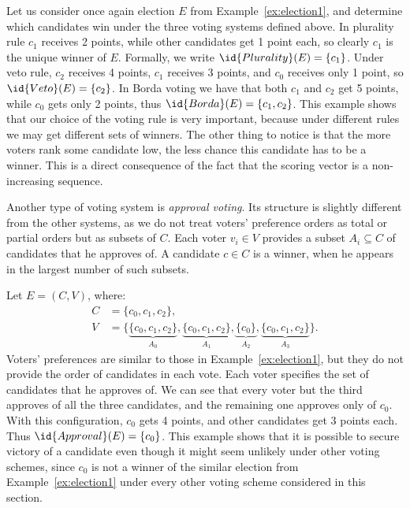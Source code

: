 Let us consider once again election $E$ from Example~\ref{ex:election1}, and determine which candidates win under the three voting systems defined above.
In plurality rule $c_1$ receives 2 points, while other candidates get 1 point each, so clearly $c_1$ is the unique winner of $E$.
Formally, we write $\id{Plurality}(E)=\{c_1\}$.
Under veto rule, $c_2$ receives 4 points, $c_1$ receives 3 points, and $c_0$ receives only 1 point, so $\id{Veto}(E)=\{c_2\}$.
In Borda voting we have that both $c_1$ and $c_2$ get 5 points, while $c_0$ gets only 2 points, thus $\id{Borda}(E)=\{c_1,c_2\}$.
This example shows that our choice of the voting rule is very important, because under different rules we may get different sets of winners.
The other thing to notice is that the more voters rank some candidate low, the less chance this candidate has to be a winner.
This is a direct consequence of the fact that the scoring vector is a non-increasing sequence.

Another type of voting system is \emph{approval voting}.
Its structure is slightly different from the other systems, as we do not treat voters' preference orders as total or partial orders but as subsets of $C$.
Each voter $v_i\in V$ provides a subset $A_i\subseteq C$ of candidates that he approves of.
A candidate $c\in C$ is a winner, when he appears in the largest number of such subsets.

\begin{Example} \label{ex:election2}
    Let $E=(C,V)$, where:
	\begin{align*}
		C &= \{c_0,c_1,c_2\}, \\
		V &= \bigl\{\underbrace{\{c_0,c_1,c_2\}}_{A_0},\underbrace{\{c_0,c_1,c_2\}}_{A_1},\underbrace{\{c_0\}}_{A_2},\underbrace{\{c_0,c_1,c_2\}}_{A_3}\bigr\}.
	\end{align*}
	Voters' preferences are similar to those in Example~\ref{ex:election1}, but they do not provide the order of candidates in each vote.
	Each voter specifies the set of candidates that he approves of.
	We can see that every voter but the third approves of all the three candidates, and the remaining one approves only of $c_0$.
	With this configuration, $c_0$ gets 4 points, and other candidates get 3 points each.
	Thus $\id{Approval}(E)=\{c_0\}$.
	This example shows that it is possible to secure victory of a candidate even though it might seem unlikely under other voting schemes, since $c_0$ is not a winner of the similar election from Example~\ref{ex:election1} under every other voting scheme considered in this section.
\end{Example}

